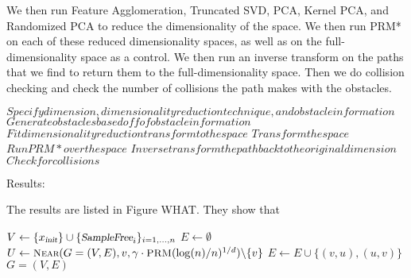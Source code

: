 \documentclass[12pt]{article}
\newcommand{\Function}[1]{\ensuremath{{\small \textsc{#1}}}}
\newcommand{\Var}[1]{\ensuremath{{\small{\textsl{#1}}}}}
\begin{document}
We then run Feature Agglomeration, Truncated SVD, PCA, Kernel PCA, and Randomized PCA to reduce the dimensionality of the space. We then run PRM* on each of these reduced dimensionality spaces, as well as on the full-dimensionality space as a control. We then run an inverse transform on the paths that we find to return them to the full-dimensionality space. Then we do collision checking and check the number of collisions the path makes with the obstacles.

\begin{algorithm}[ht] 
    \caption{$\Function{Dimensionality Reduction}$}
    \label{algo:DR}
    \begin{algorithmic}[1]
        \setcounter{ALC@line}{0}
        \vspace*{1mm}

        \STATE $Specify dimension, dimensionality reduction technique, and obstacle information$
        \STATE $Generate obstacles based off of obstacle information$
        \STATE $Fit dimensionality reduction transform to the space$
        \STATE $Transform the space$
        \STATE $Run PRM* over the space$
        \STATE $Inverse transform the path back to the original dimension$
        \STATE $Check for collisions$
    \end{algorithmic}
\end{algorithm}

Results:

The results are listed in Figure WHAT. They show that 

\begin{algorithm}[ht] 
    \caption{$\Function{PRM}^*$~\cite{karaman2011sampling}}
    \label{algo:MS}
    \begin{algorithmic}[1]
        \setcounter{ALC@line}{0}
        \vspace*{1mm}

        \STATE $V \leftarrow \{x_{\Var{init}}\} \cup \{\Var{SampleFree}_i\}_{i=1,\ldots,n}$
        \STATE $E \leftarrow \emptyset$
            \STATE $U \leftarrow \Function{Near}(G = (V, E), v,
            \gamma \cdot \Function{PRM}(\log(n) / n) ^ {1 / d})
            \backslash \{v\}$
                \IF{$\Function{CollisionFree}(v, u)$}
                    \STATE $E \leftarrow E \cup \{(v, u), (u, v)\}$
                \ENDIF
            \ENDFOR
        \ENDFOR
        \RETURN $G = (V, E)$

    \end{algorithmic}
\end{algorithm}
\end{document}
